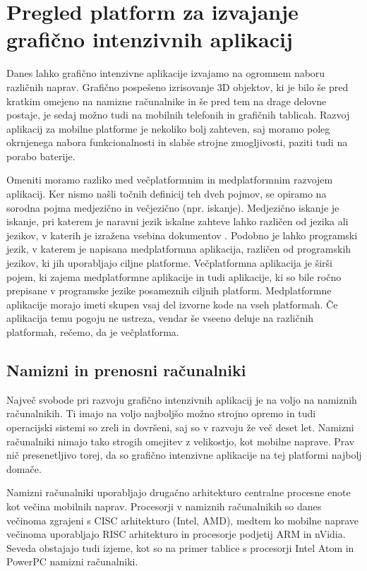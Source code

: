 \chapter{Pregled platform za izvajanje grafično intenzivnih aplikacij}

Danes lahko grafično intenzivne aplikacije izvajamo na ogromnem naboru različnih naprav. Grafično pospešeno izrisovanje 3D objektov, ki je bilo še pred kratkim omejeno na namizne računalnike in še pred tem na drage delovne postaje, je sedaj možno tudi na mobilnih telefonih in grafičnih tablicah. Razvoj aplikacij za mobilne platforme je nekoliko bolj zahteven, saj moramo poleg okrnjenega nabora funkcionalnosti in slabše strojne zmogljivosti, paziti tudi na porabo baterije.

Omeniti moramo razliko med večplatformnim in medplatformnim razvojem aplikacij. Ker nismo našli točnih definicij teh dveh pojmov, se opiramo na sorodna pojma medjezično in večjezično (npr. iskanje). Medjezično iskanje je iskanje, pri katerem je naravni jezik iskalne zahteve lahko različen od jezika ali jezikov, v katerih je izražena vsebina dokumentov \cite{jezicno}. Podobno je lahko programski jezik, v katerem je napisana medplatformna aplikacija, različen od programskih jezikov, ki jih uporabljajo ciljne platforme. Večplatformna aplikacija je širši pojem, ki zajema medplatformne aplikacije in tudi aplikacije, ki so bile ročno prepisane v programske jezike posameznih ciljnih platform. Medplatformne aplikacije morajo imeti skupen vsaj del izvorne kode na vseh platformah. Če aplikacija temu pogoju ne ustreza, vendar še vseeno deluje na različnih platformah, rečemo, da je večplatforma.

\section{Namizni in prenosni računalniki}

Največ svobode pri razvoju grafično intenzivnih aplikacij je na voljo na namiznih računalnikih. Ti imajo na voljo najboljšo možno strojno opremo in tudi operacijski sistemi so zreli in dovršeni, saj so v razvoju že več deset let. Namizni računalniki nimajo tako strogih omejitev z velikostjo, kot mobilne naprave. Prav nič presenetljivo torej, da so grafično intenzivne aplikacije na tej platformi najbolj domače. 

Namizni računalniki uporabljajo drugačno arhitekturo centralne procesne enote kot večina mobilnih naprav. Procesorji v namiznih računalnikih so danes večinoma  zgrajeni s CISC arhitekturo (Intel, AMD), medtem ko mobilne naprave večinoma uporabljajo RISC arhitekturo in procesorje podjetij ARM in nVidia. Seveda obstajajo tudi izjeme, kot so na primer tablice s procesorji Intel Atom in PowerPC namizni računalniki.  

